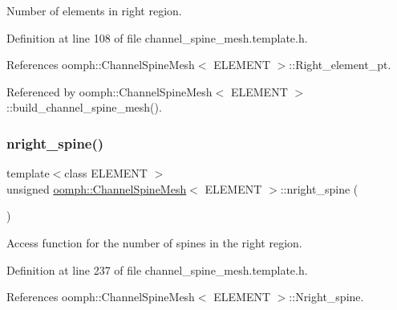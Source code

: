 Number of elements in right region. 



Definition at line 108 of file channel\+\_\+spine\+\_\+mesh.\+template.\+h.



References oomph\+::\+Channel\+Spine\+Mesh$<$ E\+L\+E\+M\+E\+N\+T $>$\+::\+Right\+\_\+element\+\_\+pt.



Referenced by oomph\+::\+Channel\+Spine\+Mesh$<$ E\+L\+E\+M\+E\+N\+T $>$\+::build\+\_\+channel\+\_\+spine\+\_\+mesh().

\mbox{\label{classoomph_1_1ChannelSpineMesh_a48ee9b7736e6884ff41e2affd4094842}} 
\subsubsection{\texorpdfstring{nright\+\_\+spine()}{nright\_spine()}}
{\footnotesize\ttfamily template$<$class E\+L\+E\+M\+E\+NT $>$ \\
unsigned \hyperlink{classoomph_1_1ChannelSpineMesh}{oomph\+::\+Channel\+Spine\+Mesh}$<$ E\+L\+E\+M\+E\+NT $>$\+::nright\+\_\+spine (\begin{DoxyParamCaption}{ }\end{DoxyParamCaption})\hspace{0.3cm}{\ttfamily [inline]}}



Access function for the number of spines in the right region. 



Definition at line 237 of file channel\+\_\+spine\+\_\+mesh.\+template.\+h.



References oomph\+::\+Channel\+Spine\+Mesh$<$ E\+L\+E\+M\+E\+N\+T $>$\+::\+Nright\+\_\+spine.

\mbox{\label{classoomph_1_1ChannelSpineMesh_a599b1d10bc47ceb9903a01b12036f400}} 
